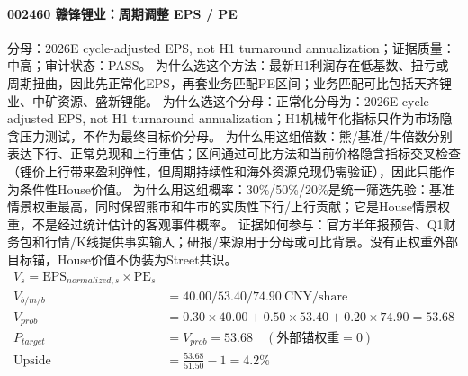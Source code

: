 \paragraph{002460 赣锋锂业：周期调整 EPS / PE}
分母：2026E cycle-adjusted EPS, not H1 turnaround annualization；证据质量：中高；审计状态：PASS。
为什么选这个方法：最新H1利润存在低基数、扭亏或周期扭曲，因此先正常化EPS，再套业务匹配PE区间；业务匹配可比包括天齐锂业、中矿资源、盛新锂能。
为什么选这个分母：正常化分母为：2026E cycle-adjusted EPS, not H1 turnaround annualization；H1机械年化指标只作为市场隐含压力测试，不作为最终目标价分母。
为什么用这组倍数：熊/基准/牛倍数分别表达下行、正常兑现和上行重估；区间通过可比方法和当前价格隐含指标交叉检查（锂价上行带来盈利弹性，但周期持续性和海外资源兑现仍需验证），因此只能作为条件性House价值。
为什么用这组概率：30\%/50\%/20\%是统一筛选先验：基准情景权重最高，同时保留熊市和牛市的实质性下行/上行贡献；它是House情景权重，不是经过统计估计的客观事件概率。
证据如何参与：官方半年报预告、Q1财务包和行情/K线提供事实输入；研报/来源用于分母或可比背景。没有正权重外部目标锚，House价值不伪装为Street共识。
\begin{align*}
V_s=\mathrm{EPS}_{normalized,s}\times \mathrm{PE}_s\\
V_{b/m/b} &= 40.00/53.40/74.90\ \mathrm{CNY/share}\\
V_{prob} &= 0.30\times 40.00+0.50\times 53.40+0.20\times 74.90=53.68\\
P_{target} &= V_{prob}=53.68\quad(\text{外部锚权重}=0)\\
\mathrm{Upside} &= \frac{53.68}{51.50}-1=4.2\%\\
\end{align*}

